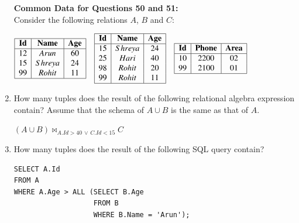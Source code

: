 \documentclass[journal]{IEEEtran}
\numberwithin{equation}{enumi}
\numberwithin{figure}{enumi}
\begin{document}
\begin{enumerate}
\textbf{Common Data for Questions 50 and 51:} \\[6pt]

Consider the following relations $A$, $B$ and $C$:

$
\begin{array}{|c|c|c|}
\hline
\textbf{Id} & \textbf{Name} & \textbf{Age} \\
\hline
12 & Arun   & 60 \\
15 & Shreya & 24 \\
99 & Rohit  & 11 \\
\hline
\end{array}
\quad
\begin{array}{|c|c|c|}
\hline
\textbf{Id} & \textbf{Name} & \textbf{Age} \\
\hline
15 & Shreya & 24 \\
25 & Hari   & 40 \\
98 & Rohit  & 20 \\
99 & Rohit  & 11 \\
\hline
\end{array}
\quad
\begin{array}{|c|c|c|}
\hline
\textbf{Id} & \textbf{Phone} & \textbf{Area} \\
\hline
10 & 2200 & 02 \\
99 & 2100 & 01 \\
\hline
\end{array}
$

\item How many tuples does the result of the following relational algebra expression contain? Assume that the schema of $A \cup B$ is the same as that of $A$.  

$
(A \cup B) \bowtie_{A.Id > 40 \,\vee\, C.Id < 15} C
$

\begin{enumerate}
\end{enumerate}


\item How many tuples does the result of the following SQL query contain?

\begin{verbatim}
SELECT A.Id
FROM A
WHERE A.Age > ALL (SELECT B.Age
                   FROM B
                   WHERE B.Name = 'Arun');
\end{verbatim}


\end{enumerate}
\end{document}
